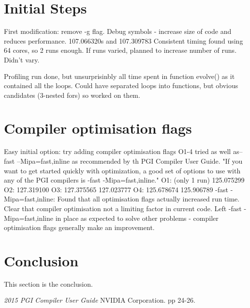 \documentclass[11pt, oneside]{article}   %
\begin{document}
\section{Initial Steps}
First modification: remove -g flag.
Debug symbols - increase size of code and reduces performance.
107.066320s and 107.309783 
Consistent timing found using 64 cores, so 2 runs enough.
If runs varied, planned to increase number of runs.  Didn't vary.

Profiling run done, but unsurprisinbly all time spent in function evolve() as it contained all the loops.  Could have separated loops into functions, but obvious candidates (3-nested fors) so worked on them.

\section{Compiler optimisation flags}
Easy initial option: try adding compiler optimisation flags  O1-4 tried as well as–fast –Mipa=fast,inline  as recommended by th PGI Compiler User Guide. \cite{ref:PgiCC}  "If you want to get started quickly with optimization, a good set of options to use with any of the PGI compilers is -fast -Mipa=fast,inline."
O1: (only 1 run) 125.075299
O2: 127.319100
O3: 127.375565 127.023777
O4: 125.678674 125.906789
-fast -Mipa=fast,inline: 
Found that all optimisation flags actually increased run time.  Clear that compiler optimisation not a limiting factor in current code.
Left -fast -Mipa=fast,inline in place as expected to solve other problems - compiler optimisation flags generally make an improvement.

\section{Conclusion}
This section is the conclusion.

\begin{thebibliography}{100}

 {\em 2015 PGI Compiler User Guide} NVIDIA Corporation. pp 24-26.

\end{thebibliography}
\end{document}
